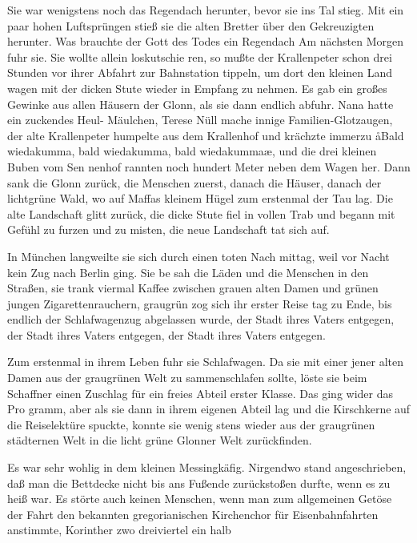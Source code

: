 Sie war wenigstens noch das Regendach herunter, bevor
sie ins Tal stieg. Mit ein paar hohen Luftsprüngen stieß sie
die alten Bretter über den Gekreuzigten herunter. Was
brauchte der Gott des Todes ein Regendach\ausr
\abstand
Am nächsten Morgen fuhr sie. Sie wollte allein loskutschie\-%
ren, so mußte der Krallenpeter schon drei Stunden vor ihrer
Abfahrt zur Bahnstation tippeln, um dort den kleinen Land\-%
wagen mit der dicken Stute wieder in Empfang zu nehmen.
Es gab ein großes Gewinke aus allen Häusern der Glonn, als
sie dann endlich abfuhr. Nana hatte ein zuckendes Heul-%
Mäulchen, Terese Nüll mache innige Familien-Glotzaugen,
der alte Krallenpeter humpelte aus dem Krallenhof und
krächzte immerzu\dopp{} \aa Bald wiedakumma, bald wiedakumma,
bald wiedakumma\ausr\ae, und die drei kleinen Buben vom Sen\-%
nenhof rannten noch hundert Meter neben dem Wagen her.
Dann sank die Glonn zurück, die Menschen zuerst, danach die
Häuser, danach der lichtgrüne Wald, wo auf Maffas kleinem
Hügel zum erstenmal der Tau lag. Die alte Landschaft glitt
zurück, die dicke Stute fiel in vollen Trab und begann mit
Gefühl zu furzen und zu misten, die neue Landschaft tat sich
auf.

In München langweilte sie sich durch einen toten Nach\-%
mittag, weil vor Nacht kein Zug nach Berlin ging. Sie be\-%
sah die Läden und die Menschen in den Straßen, sie trank
viermal Kaffee zwischen grauen alten Damen und grünen
jungen Zigarettenrauchern, graugrün zog sich ihr erster Reise\-%
tag zu Ende, bis endlich der Schlafwagenzug abgelassen
wurde, der Stadt ihres Vaters entgegen, der Stadt ihres
Vaters entgegen, der Stadt ihres Vaters entgegen.

Zum erstenmal in ihrem Leben fuhr sie Schlafwagen. Da sie
mit einer jener alten Damen aus der graugrünen Welt zu\-%
sammenschlafen sollte, löste sie beim Schaffner einen Zuschlag
für ein freies Abteil erster Klasse. Das ging wider das Pro\-%
gramm, aber als sie dann in ihrem eigenen Abteil lag und
die Kirschkerne auf die Reiselektüre spuckte, konnte sie wenig\-%
stens wieder aus der graugrünen städternen Welt in die licht\-%
grüne Glonner Welt zurückfinden.

Es war sehr wohlig in dem kleinen Messingkäfig. Nirgendwo
stand angeschrieben, daß man die Bettdecke nicht bis ans
Fußende zurückstoßen durfte, wenn es zu heiß war. Es störte
auch keinen Menschen, wenn man zum allgemeinen Getöse
der Fahrt den bekannten gregorianischen Kirchenchor für
Eisenbahnfahrten anstimmte, Korinther zwo dreiviertel ein\-%
halb\dopp

